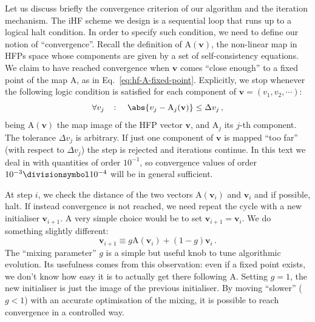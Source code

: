 Let us discuss briefly the convergence criterion of our algorithm and the iteration mechanism. The iHF scheme we design is a sequential loop that runs up to a logical halt condition. In order to specify such condition, we need to define our notion of ``convergence''. Recall the definition of $\mathrm{A}(\mathbf{v})$, the non-linear map in HFPs space whose components are given by a set of self-consistency equations. We claim to have reached convergence when $\mathbf{v}$ comes ``close enough'' to a fixed point of the map $\mathrm{A}$, as in Eq.~\eqref{eq:hf-A-fixed-point}. Explicitly, we stop whenever the following logic condition is satisfied for each component of $\mathbf{v} = (v_1, v_2, \cdots)$:
\[
	\forall v_j
	\quad\colon\quad
	\abs{v_j-\mathrm{A}_j(\mathbf{v})} \le \Delta v_j \, ,
\]
being $\mathrm{A}(\mathbf{v})$ the map image of the HFP vector $\mathbf{v}$, and $\mathrm{A}_j$ its $j$-th component. The tolerance $\Delta v_j$ is arbitrary. If just one component of $\mathbf{v}$ is mapped ``too far'' (with respect to $\Delta v_j$) the step is rejected and iterations continue. In this text we deal in with quantities of order $10^{-1}$, so convergence values of order $10^{-3} \divisionsymbol 10^{-4}$ will be in general sufficient. 

At step $i$, we check the distance of the two vectors $\mathrm{A}(\mathbf{v}_i)$ and $\mathbf{v}_i$ and if possible, halt. If instead convergence is not reached, we need repeat the cycle with a new initialiser $\mathbf{v}_{i+1}$. A very simple choice would be to set $\mathbf{v}_{i+1} = \mathbf{v}_i$. We do something slightly different:
\begin{equation}\label{eq:mix}
	\mathbf{v}_{i+1} \equiv g \mathrm{A} \left( \mathbf{v}_{i} \right) + (1-g) \mathbf{v}_{i} \, .
\end{equation}
The ``mixing parameter'' $g$ is a simple but useful knob to tune algorithmic evolution. Its usefulness comes from this observation: even if a fixed point exists, we don't know how easy it is to actually get there following $\mathrm{A}$. Setting $g=1$, the new initialiser is just the image of the previous initialiser. By moving ``slower'' ($g<1$) with an accurate optimisation of the mixing, it is possible to reach convergence in a controlled way.

